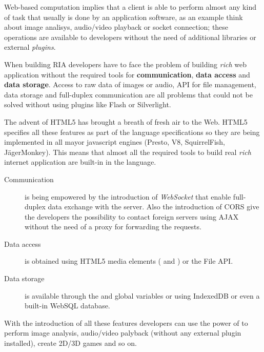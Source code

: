 

Web-based computation implies that a client is able to perform almost any kind of task that usually
is done by an application software, as an example think about image analisys, audio/video playback
or socket connection; these operations are available to developers without the need of additional
libraries or external \emph{plugins}.

When building \ac{RIA} developers have to face the problem of building \emph{rich} web application
without the required tools for \textbf{communication}, \textbf{data access} and \textbf{data storage}.
Access to raw data of images or audio, API for file management, data storage and full-duplex
communication are all problems that could not be solved without using plugins like Flash or Silverlight.

The advent of HTML5 has brought a breath of fresh air to the Web. HTML5 specifies all these features
as part of the language specifications so they are being implemented in all mayor javascript
engines (Presto, V8, SquirrelFish, JägerMonkey). This means that almost all the required tools to build
real \emph{rich} internet application are built-in in the \js{} language.

\begin{description}
  \item[Communication] is being empowered by the introduction of \emph{WebSocket} that enable full-duplex
  data exchange with the server. Also the introduction of \ac{CORS} give the developers the possibility
  to contact foreign servers using \ac{AJAX} without the need of a proxy for forwarding the requests.
  \item[Data access] is obtained using HTML5 media elements ( and )
  or the File API.
  \item[Data storage] is available through the  and 
  global variables or using IndexedDB or even a built-in WebSQL database.
\end{description}


With the introduction of all these features developers can use the power of \js{} to perform image analysis,
audio/video palyback (without any external plugin installed), create 2D/3D games and so on.

